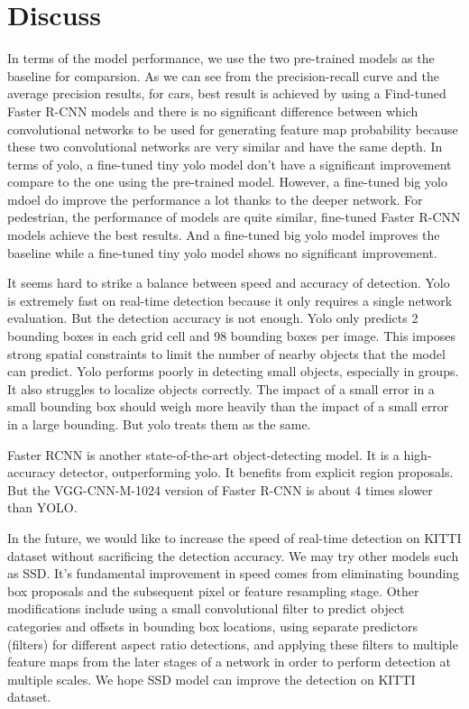 \section{Discuss}
In terms of the model performance, we use the two pre-trained 
models as the baseline for comparsion.
As we can see from the precision-recall curve and the average precision results, for cars, best result is achieved by 
using a Find-tuned Faster R-CNN models and there is 
no significant difference between which convolutional networks 
to be used for generating feature map probability because 
these two convolutional networks are very similar 
and have the same depth.
In terms of yolo, 
a fine-tuned tiny yolo model don't have a significant 
improvement compare to the one using the pre-trained model.
However, a fine-tuned big yolo mdoel do improve the performance 
a lot thanks to the deeper network.
For pedestrian, the performance of models are quite similar,
fine-tuned Faster R-CNN models achieve the best results. 
And a fine-tuned big yolo model improves the baseline while 
a fine-tuned tiny yolo model shows no significant improvement.



It seems hard to strike a balance between speed and accuracy of detection. Yolo is extremely fast on real-time detection because it only requires a single network evaluation. But the detection accuracy is not enough. Yolo only predicts 2 bounding boxes in each grid cell and 98 bounding boxes per image. This imposes strong spatial constraints to limit the number of nearby objects that the model can predict. Yolo performs poorly in detecting small objects, especially in groups. It also struggles to localize objects correctly. The impact of a small error in a small bounding box should weigh more heavily than the impact of a small error in a large bounding. But yolo treats them as the same.

Faster RCNN is another state-of-the-art object-detecting model. It is a high-accuracy detector, outperforming yolo. It benefits from explicit region proposals. But the VGG-CNN-M-1024 version of Faster R-CNN is about 4 times slower than YOLO.

In the future, we would like to increase the speed of real-time detection on KITTI dataset without sacrificing the detection accuracy. We may try other models such as SSD. It's fundamental improvement in speed comes from eliminating bounding box proposals and the subsequent pixel or feature resampling stage. Other modifications include using a small convolutional filter to predict object categories and offsets in bounding box locations, using separate predictors (filters) for different aspect ratio detections, and applying these filters to multiple feature maps from the later stages of a network in order to perform detection at multiple scales. We hope SSD model can improve the detection on KITTI dataset.

